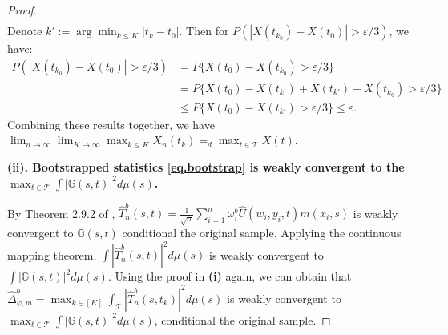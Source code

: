\documentclass[
  12pt]{article}
\newtheorem{theorem}{Theorem}
\def\to{\rightarrow}
\def\wh{\widehat}
\def\mG{\mathbb{G}}
\def\cT{\mathcal{T}}
\begin{document}
\begin{proof}
\begin{align*}
\end{align*}
\endgroup
Denote $k':=\arg\min_{k \leq K} |t_k - t_0|$. Then for $P(|X(t_{k_0}) - X(t_{0})| > \varepsilon/3)$, we have:
\begin{align*}
    P(|X(t_{k_0}) - X(t_{0})| > \varepsilon/3) & = P\{X(t_{0}) - X(t_{k_0})  > \varepsilon/3\} \\
    & = P\{X(t_{0}) - X(t_{k'}) + X(t_{k'}) - X(t_{k_0})  > \varepsilon/3\} \\
    & \leq P\{X(t_{0}) - X(t_{k'}) > \varepsilon/3\} \leq \varepsilon. 
\end{align*}
Combining these results together, we have $\lim_{n \to \infty} \lim_{K \to \infty} \max_{k \leq K} X_n(t_k) =_d \max_{t \in \cT} X(t)$. 


\textbf{(ii). Bootstrapped statistics \eqref{eq.bootstrap} is weakly convergent to the $\max_{t \in \cT}\int{| \mathbb{G}(s,t)|^2d\mu(s)}$.}

By Theorem 2.9.2 of \cite{wellner2013weak}, $\wh{T}^b_n(s,t) = \frac{1}{\sqrt{n}} \sum_{i=1}^n \omega^b_i \wh{U}(w_i,y_i,t)m(x_i,s)$ is weakly convergent to $\mG(s,t)$ conditional the original sample. Applying the continuous mapping theorem, $\int{|\wh{T}^b_n(s,t)|^2d\mu(s)}$ is weakly convergent to $\int{|\mathbb{G}(s,t)|^2d\mu(s)}$. Using the proof in \textbf{(i)} again, we can obtain that $\wh{\Delta}^b_{\varphi,m} = \max_{k\in [K]} \int_{\cT} |\wh{T}^b_n(s,t_k)|^2d\mu(s)$ is weakly convergent to $\max_{t \in \cT}\int{| \mathbb{G}(s,t)|^2d\mu(s)}$, conditional the original sample.
\end{proof}

   
\end{document}
